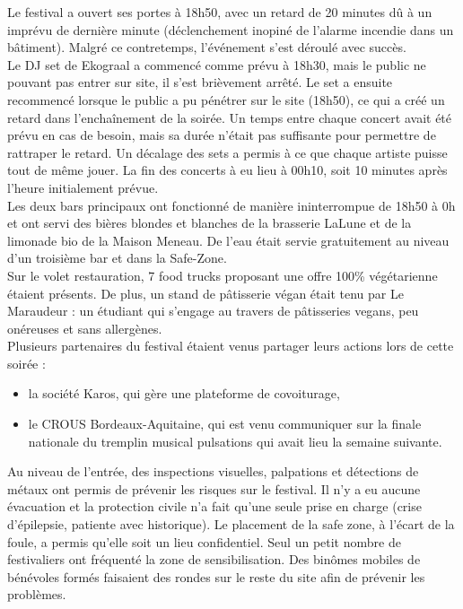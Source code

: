 \documentclass[12pt,a4paper]{report}
\begin{document}
Le festival a ouvert ses portes à 18h50, avec un retard de 20 minutes dû à un imprévu de dernière minute (déclenchement inopiné de l'alarme incendie dans un bâtiment). Malgré ce contretemps, l'événement s'est déroulé avec succès.\\

Le DJ set de Ekograal a commencé comme prévu à 18h30, mais le public ne pouvant pas entrer sur site, il s'est brièvement arrêté. Le set a ensuite recommencé lorsque le public a pu pénétrer sur le site (18h50), ce qui a créé un retard dans l'enchaînement de la soirée. Un temps entre chaque concert avait été prévu en cas de besoin, mais sa durée n'était pas suffisante pour permettre de rattraper le retard. Un décalage des sets a permis à ce que chaque artiste puisse tout de même jouer. La fin des concerts à eu lieu à 00h10, soit 10 minutes après l’heure initialement prévue.\\

Les deux bars principaux ont fonctionné de manière ininterrompue de 18h50 à 0h et ont servi des bières blondes et blanches de la brasserie LaLune et de la limonade bio de la Maison Meneau. De l’eau était servie gratuitement au niveau d’un troisième bar et dans la Safe-Zone.\\

Sur le volet restauration, 7 food trucks proposant une offre 100\% végétarienne étaient présents. De plus, un stand de pâtisserie végan était tenu par Le Maraudeur : un étudiant qui s'engage au travers de pâtisseries vegans, peu onéreuses et sans allergènes.\\

Plusieurs partenaires du festival étaient venus partager leurs actions lors de cette soirée : 
\begin{itemize}
\item la société Karos, qui gère une plateforme de covoiturage,
\item le CROUS Bordeaux-Aquitaine, qui est venu communiquer sur la finale nationale du tremplin musical pulsations qui avait lieu la semaine suivante.\\
\end{itemize}

Au niveau de l’entrée, des inspections visuelles, palpations et détections de métaux ont permis de prévenir les risques sur le festival. Il n'y a eu aucune évacuation et la protection civile n’a fait qu’une seule prise en charge (crise d'épilepsie, patiente avec historique). Le placement de la safe zone, à l'écart de la foule, a permis qu'elle soit un lieu confidentiel. Seul un petit nombre de festivaliers ont fréquenté la zone de sensibilisation. Des binômes mobiles de bénévoles formés faisaient des rondes sur le reste du site afin de prévenir les problèmes.\\
\end{document}
